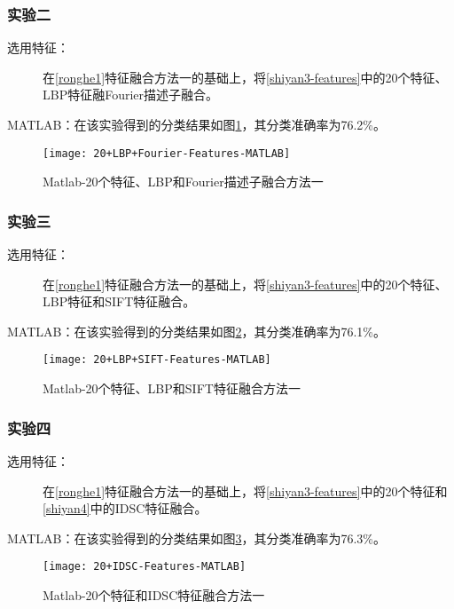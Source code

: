 \subsubsection{实验二}
\begin{description}
\item[选用特征：] 在\ref{ronghe1}特征融合方法一的基础上，将\ref{shiyan3-features}中的20个特征、LBP特征融Fourier描述子融合。
\end{description}
MATLAB：在该实验得到的分类结果如图\ref{fig:20+LBP+Fourier-Features-MATLAB}，其分类准确率为76.2\%。
\begin{figure}[!ht]
\centering
\texttt{[image: 20+LBP+Fourier-Features-MATLAB]}
\caption{Matlab-20个特征、LBP和Fourier描述子融合方法一}
\label{fig:20+LBP+Fourier-Features-MATLAB}
\end{figure}

\subsubsection{实验三}
\begin{description}
\item[选用特征：] 在\ref{ronghe1}特征融合方法一的基础上，将\ref{shiyan3-features}中的20个特征、LBP特征和SIFT特征融合。
\end{description}
MATLAB：在该实验得到的分类结果如图\ref{fig:20+LBP+SIFT-Features-MATLAB}，其分类准确率为76.1\%。
\begin{figure}[!ht]
\centering
\texttt{[image: 20+LBP+SIFT-Features-MATLAB]}
\caption{Matlab-20个特征、LBP和SIFT特征融合方法一}
\label{fig:20+LBP+SIFT-Features-MATLAB}
\end{figure}

\subsubsection{实验四}
\begin{description}
\item[选用特征：] 在\ref{ronghe1}特征融合方法一的基础上，将\ref{shiyan3-features}中的20个特征和\ref{shiyan4}中的IDSC特征融合。
\end{description}
MATLAB：在该实验得到的分类结果如图\ref{fig:20+IDSC-Features-MATLAB}，其分类准确率为76.3\%。
\begin{figure}[!ht]
\centering
\texttt{[image: 20+IDSC-Features-MATLAB]}
\caption{Matlab-20个特征和IDSC特征融合方法一}
\label{fig:20+IDSC-Features-MATLAB}
\end{figure}

